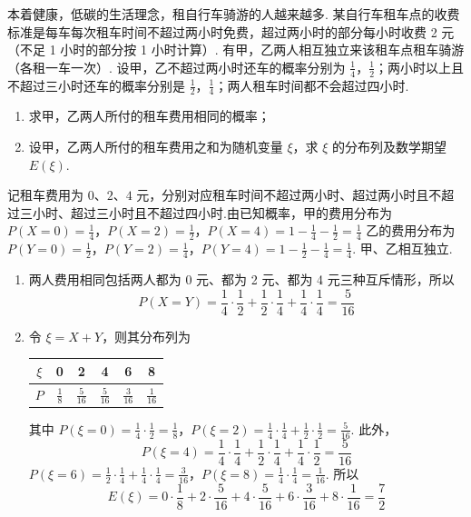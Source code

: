 \begin{problem}
本着健康，低碳的生活理念，租自行车骑游的人越来越多. 某自行车租车点的收费标准是每车每次租车时间不超过两小时免费，超过两小时的部分每小时收费 2 元（不足 1 小时的部分按 1 小时计算）. 有甲，乙两人相互独立来该租车点租车骑游（各租一车一次）. 设甲，乙不超过两小时还车的概率分别为 \(\frac{1}{4}\)，\(\frac{1}{2}\)；两小时以上且不超过三小时还车的概率分别是 \(\frac{1}{2}\)，\(\frac{1}{4}\)；两人租车时间都不会超过四小时.
\begin{enumerate}
\item 求甲，乙两人所付的租车费用相同的概率；
\item 设甲，乙两人所付的租车费用之和为随机变量 \(\xi\)，求 \(\xi\) 的分布列及数学期望 \(E(\xi)\).
\end{enumerate}
\end{problem}

\begin{solution}
记租车费用为 \(0\)、\(2\)、\(4\) 元，分别对应租车时间不超过两小时、超过两小时且不超过三小时、超过三小时且不超过四小时.由已知概率，甲的费用分布为
\(P(X=0)=\frac14\)，\(P(X=2)=\frac12\)，\(P(X=4)=1-\frac14-\frac12=\frac14\)
乙的费用分布为
\(P(Y=0)=\frac12\)，\(P(Y=2)=\frac14\)，\(P(Y=4)=1-\frac12-\frac14=\frac14\).
甲、乙相互独立.

\begin{enumerate}
\item 两人费用相同包括两人都为 0 元、都为 2 元、都为 4 元三种互斥情形，所以
\[
P(X=Y)=\frac14\cdot\frac12+\frac12\cdot\frac14+\frac14\cdot\frac14=\frac5{16}
\]

\item 令 \(\xi=X+Y\)，则其分布列为
\begin{center}
\begin{tabular}{c|ccccc}
\(\xi\) & 0 & 2 & 4 & 6 & 8\\ \hline
\(P\) & \(\frac18\) & \(\frac5{16}\) & \(\frac5{16}\) & \(\frac3{16}\) & \(\frac1{16}\)
\end{tabular}
\end{center}
其中
\(P(\xi=0)=\frac14\cdot\frac12=\frac18\)，\(P(\xi=2)=\frac14\cdot\frac14+\frac12\cdot\frac12=\frac5{16}\).
此外，
\[
P(\xi=4)=\frac14\cdot\frac14+\frac12\cdot\frac14+\frac14\cdot\frac12=\frac5{16}
\]
\(P(\xi=6)=\frac12\cdot\frac14+\frac14\cdot\frac14=\frac3{16}\)，\(P(\xi=8)=\frac14\cdot\frac14=\frac1{16}\).
所以
\[
E(\xi)=0\cdot\frac18+2\cdot\frac5{16}+4\cdot\frac5{16}+6\cdot\frac3{16}+8\cdot\frac1{16}=\frac72
\]
\end{enumerate}
\end{solution}

